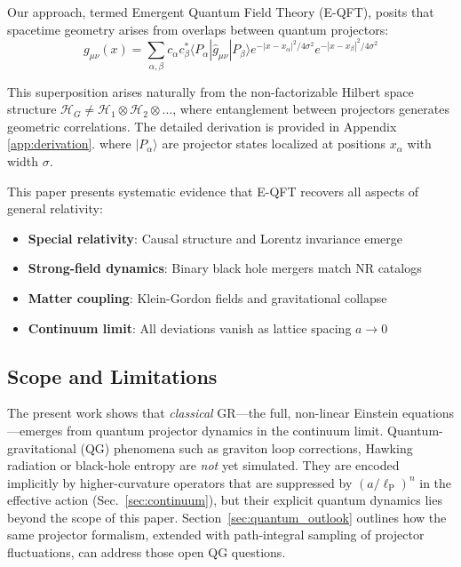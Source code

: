 \documentclass[11pt,a4paper]{article}
\begin{document}
Our approach, termed Emergent Quantum Field Theory (E-QFT), posits that spacetime geometry arises from overlaps between quantum projectors:
\begin{equation}
g_{\mu\nu}(x) = \sum_{\alpha,\beta} c_\alpha c_\beta^* \langle P_\alpha | \hat{g}_{\mu\nu} | P_\beta \rangle e^{-|x-x_\alpha|^2/4\sigma^2} e^{-|x-x_\beta|^2/4\sigma^2}
\end{equation}

This superposition arises naturally from the non-factorizable Hilbert space structure $\mathcal{H}_G \neq \mathcal{H}_1 \otimes \mathcal{H}_2 \otimes \ldots$, where entanglement between projectors generates geometric correlations. The detailed derivation is provided in Appendix \ref{app:derivation}.
where $|P_\alpha\rangle$ are projector states localized at positions $x_\alpha$ with width $\sigma$.

This paper presents systematic evidence that E-QFT recovers all aspects of general relativity:
\begin{itemize}
\item \textbf{Special relativity}: Causal structure and Lorentz invariance emerge
\item \textbf{Strong-field dynamics}: Binary black hole mergers match NR catalogs
\item \textbf{Matter coupling}: Klein-Gordon fields and gravitational collapse
\item \textbf{Continuum limit}: All deviations vanish as lattice spacing $a \to 0$
\end{itemize}

\subsection{Scope and Limitations}

The present work shows that \emph{classical} GR---the full, non-linear Einstein equations---emerges from quantum projector dynamics in the continuum limit. Quantum-gravitational (QG) phenomena such as graviton loop corrections, Hawking radiation or black-hole entropy are \textit{not} yet simulated. They are encoded implicitly by higher-curvature operators that are suppressed by $(a/\ell_{\text{P}})^n$ in the effective action (Sec.~\ref{sec:continuum}), but their explicit quantum dynamics lies beyond the scope of this paper. Section~\ref{sec:quantum_outlook} outlines how the same projector formalism, extended with path-integral sampling of projector fluctuations, can address those open QG questions.
\end{document}
